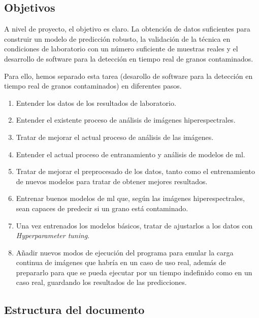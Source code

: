 \subsection{Objetivos}

A nivel de proyecto, el objetivo es claro. La obtención de datos suficientes para construir un modelo de predicción robusto, la validación de la técnica en
condiciones de laboratorio con un número suficiente de muestras reales y el desarrollo de software para la detección en tiempo real de granos contaminados. 

Para ello, hemos separado esta tarea (desarollo de software para la detección en tiempo real de granos contaminados) en diferentes pasos. 

\begin{enumerate}
    \item Entender los datos de los resultados de laboratorio.
    \item Entender el existente proceso de análisis de imágenes hiperespectrales.
    \item Tratar de mejorar el actual proceso de análisis de las imágenes.
    \item Entender el actual proceso de entranamiento y análisis de modelos de \gls{ml}.
    \item Tratar de mejorar el preprocesado de los datos, tanto como el entrenamiento de nuevos modelos para tratar de obtener mejores resultados.
    \item Entrenar buenos modelos de \gls{ml} que, según las imágenes hiperespectrales, sean capaces de predecir si un grano está contaminado. 
    \item Una vez entrenados los modelos básicos, tratar de ajustarlos a los datos con \textit{Hyperparameter tuning}.
    \item Añadir nuevos modos de ejecución del programa para emular la carga continua de imágenes que habría en un caso de uso real, además de prepararlo para que se 
    pueda ejecutar por un tiempo indefinido como en un caso real, guardando los resultados de las predicciones.
\end{enumerate}

\subsection{Estructura del documento}